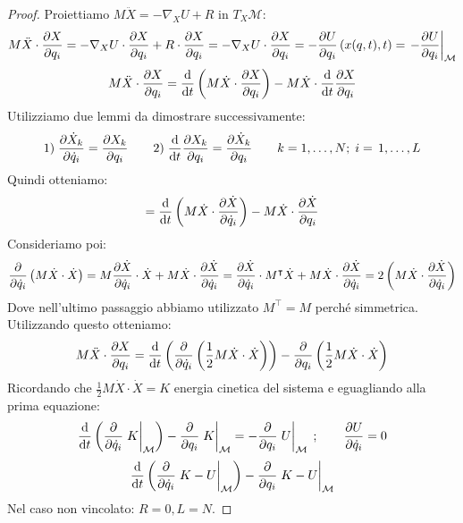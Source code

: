 \begin{proof}
    Proiettiamo $M\ddot{X} = -\nabla_X U + R$ in $T_X\mathcal{M}$:
    \begin{equation*}
        M\ddot{X}\cdot \pdv{X}{q_i}= -\nabla_X U \cdot \pdv{X}{q_i}+ R\cdot\pdv{X}{q_i}= -\nabla_X U \cdot \pdv{X}{q_i}
        = -\pdv{U}{q_i}\left( x(q,t),t   \right)= \eval{ -\pdv{U}{q_i}}_{\mathcal{M}}
    \end{equation*}
    \begin{equation}
        M\ddot{X}\cdot \pdv{X}{q_i}= \dv{}{t}\left( M\dot{X}\cdot \pdv{X}{q_i} \right)-M\dot{X}\cdot\dv{}{t}\pdv{X}{q_i}
    \end{equation}
    Utilizziamo due lemmi da dimostrare successivamente:
    \begin{equation}
        1) \; \pdv{\dot{X}_k}{\dot{q}_i}= \pdv{X_k}{q_i} \qquad 2)\; \dv{}{t}\pdv{X_k}{q_i}= \pdv{\dot{X}_k}{q_i}\qquad k = 1,\dots,N;\; i = \, 1,\dots, L 
    \end{equation}
    Quindi otteniamo:
    \begin{equation*}
        = \dv{}{t}\left( M\dot{X}\cdot\pdv{\dot{X}}{\dot{q}_i} \right)-M\dot{X}\cdot \pdv{\dot{X}}{q_i}
    \end{equation*}
    Consideriamo poi:
    \begin{equation*}
        \pdv{}{\dot{q}_i}\left( M\dot{X}\cdot\dot{X} \right)= M\pdv{\dot{X}}{\dot{q}_i}\cdot\dot{X}+ M\dot{X}\cdot\pdv{\dot{X}}{\dot{q}_i}=
        \pdv{\dot{X}}{\dot{q}_i}\cdot M^\intercal \dot{X} + M\dot{X}\cdot\pdv{\dot{X}}{\dot{q}_i}= 2\left( M\dot{X}\cdot\pdv{\dot{X}}{\dot{q}_i} \right)
    \end{equation*}
    Dove nell'ultimo passaggio abbiamo utilizzato $M^\intercal= M$ perché simmetrica. Utilizzando questo otteniamo:
    \begin{equation*}
        M\ddot{X}\cdot\pdv{X}{q_i}= \dv{}{t}\left( \pdv{}{\dot{q}_i }\left( \frac{1}{2}M\dot{X}\cdot\dot{X} \right) \right)- \pdv{}{q_i}\left( \frac{1}{2}M\dot{X}\cdot\dot{X} \right)
    \end{equation*}
    Ricordando che $\frac{1}{2}M\dot{X}\cdot\dot{X}= K$ energia cinetica del sistema e eguagliando alla prima equazione:
    \begin{equation*}
        \dv{}{t} \left( \pdv{\dot{q}_i} \eval{K}_{\mathcal{M}} \right)- \pdv{}{q_i}\eval{K}_{\mathcal{M}}= -\pdv{}{q_i} \eval{U}_{\mathcal{M}} \;;\qquad \pdv{U}{\dot{q}_i}=0
    \end{equation*}
    \begin{equation}
        \dv{}{t}\left( \pdv{}{\dot{q}_i} \eval{K-U}_{\mathcal{M}} \right)-\pdv{}{q_i}\eval{K-U}_{\mathcal{M}}
    \end{equation}
    Nel caso non vincolato: $R = 0, L = N$.
\end{proof}

